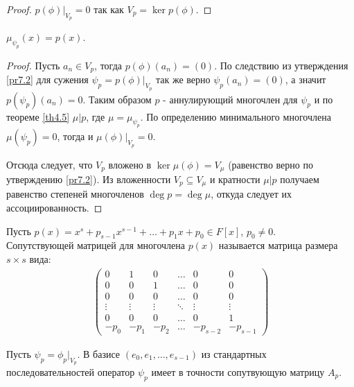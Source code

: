 \begin{proof}
    $p(\phi) \vert_{V_p} = 0$ так как $V_p = \ker p(\phi)$.
\end{proof}

\begin{proposition}
    $\mu_{\psi_p} (x) = p(x)$.
\end{proposition}

\begin{proof}
    Пусть $a_n \in V_p$, тогда $p(\phi) (a_n) = (0)$. По следствию из утверждения \ref{pr7.2} 
    для сужения $\psi_p = p(\phi) \vert_{V_p}$ так же верно $\psi_p (a_n) = (0)$, а
    значит $p(\psi_p) (a_n) = 0$. Таким образом $p$ - аннулирующий многочлен для $\psi_p$ и по 
    теореме \ref{th4.5} $\mu \vert p$, где $\mu = \mu_{\psi_p}$.
    По определению минимального многочлена $\mu(\psi_p) = 0$, тогда и $\mu(\phi) \vert_{V_p} = 0$.

    Отсюда следует, что $V_p$ вложено в $\ker \mu(\phi) = V_{\mu}$ (равенство верно по утверждению 
    \ref{pr7.2}). Из вложенности $V_p \subseteq V_{\mu}$ и кратности $\mu \vert p$ получаем 
    равенство степеней многочленов $\deg p = \deg \mu$, откуда следует их ассоциированность.
\end{proof}

\begin{definition}
    Пусть $p(x) = x^s + p_{s-1} x^{s-1} + \dots + p_1 x + p_0 \in F[x]$, $p_0 \neq 0$.\\
    Сопутствующей матрицей для многочлена $p(x)$ называется матрица размера $s \times s$ вида:
    \begin{gather*}
        \begin{pmatrix}
        0      & 1      & 0      & \dots  & 0        & 0          \\
        0      & 0      & 1      & \dots  & 0        & 0          \\
        0      & 0      & 0      & \dots  & 0        & 0          \\
        \vdots & \vdots & \vdots & \ddots & \vdots   & \vdots     \\
        0      & 0      & 0      & \dots  & 0        & 1          \\
        -p_0   & -p_1   & -p_2   & \dots  & -p_{s-2} & -p_{s-1}
        \end{pmatrix}
    \end{gather*}
\end{definition}

\begin{proposition}
    \label{pr7.4}
    Пусть $\psi_p = \phi_p \vert_{V_p}$. В базисе $(e_0, e_1, \dots, e_{s-1})$ из стандартных 
    последовательностей оператор $\psi_p$ имеет в точности сопутвующую матрицу $A_p$.
\end{proposition}

